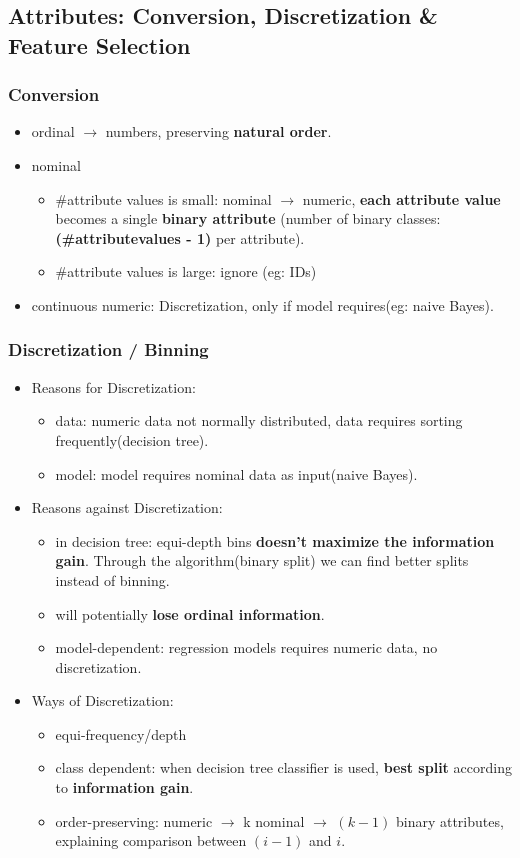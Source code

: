 \subsection{Attributes: Conversion, Discretization \& Feature Selection}
\subsubsection{Conversion}
\begin{itemize}
	\item ordinal $\rightarrow$ numbers, preserving \textbf{natural order}.
	\item nominal 
	\begin{itemize}
		\item \#attribute values is small: nominal $\rightarrow$ numeric, \textbf{each attribute value} becomes a single \textbf{binary attribute} (number of binary classes: \textbf{(\#attributevalues - 1)} per attribute).
		\item \#attribute values is large: ignore (eg: IDs)
	\end{itemize}
	\item continuous numeric: Discretization, only if model requires(eg: naive Bayes).
\end{itemize}

\subsubsection{Discretization / Binning}
\begin{itemize}
	\item Reasons for Discretization:
	\begin{itemize}
		\item data: numeric data not normally distributed, data requires sorting frequently(decision tree).
		\item model: model requires nominal data as input(naive Bayes).
	\end{itemize}
	\item Reasons against Discretization:
	\begin{itemize}
		\item in decision tree: equi-depth bins \textbf{doesn't maximize the information gain}. Through the algorithm(binary split) we can find better splits instead of binning.
		\item will potentially \textbf{lose ordinal information}.
		\item model-dependent: regression models requires numeric data, no discretization.
	\end{itemize}
	\item Ways of Discretization:
	\begin{itemize}
		\item equi-frequency/depth
		\item class dependent: when decision tree classifier is used, \textbf{best split} according to \textbf{information gain}.
		\item order-preserving: numeric $\rightarrow$ k nominal $\rightarrow$ $(k-1)$ binary attributes, explaining comparison between $(i-1)$ and $i$.
	\end{itemize}
\end{itemize}
